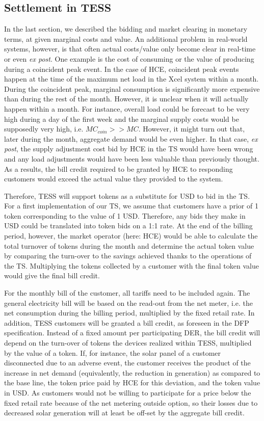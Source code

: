 \documentclass[12pt]{article}{Definitions/mdpi}
\begin{document}
\subsection{Settlement in TESS}\label{sec:hce_settlement}

In the last section, we described the bidding and market clearing in monetary terms, at given marginal costs and value. An additional problem in real-world systems, however, is that often actual costs/value only become clear in real-time or even  \textit{ex post}. One example is the cost of consuming or the value of producing during a coincident peak event. In the case of HCE, coincident  peak events happen at the time of the maximum net load in the Xcel system within a month. During the coincident peak, marginal consumption is significantly more expensive than during the rest of the month. However, it is unclear when it will actually happen within a month. For instance, overall load could be forecast to be very high during a day of the first week and the marginal supply costs would be supposedly very high, i.e. $MC_{coin} >> MC$. However, it might turn out that, later during the month, aggregate demand would be even higher. In that case, \textit{ex post}, the supply adjustment cost bid by HCE in the TS would have been wrong and any load adjustments would have been less valuable than previously thought. As a results, the bill credit required to be granted by HCE to responding customers would exceed the actual value they provided to the system.

Therefore, TESS will support tokens as a substitute for USD to bid in the TS. For a first implementation of our TS, we assume that customers have a prior of 1 token corresponding to the value of 1 USD. Therefore, any bids they make in USD could be translated into token bids on a 1:1 rate. 
At the end of the billing period, however, the market operator (here: HCE) would be able to calculate the total turnover of tokens during the month and determine the actual token value by comparing the turn-over to the savings achieved thanks to the operations of the TS. Multiplying the tokens collected by a customer with the final token value would give the final bill credit.

For the monthly bill of the customer, all tariffs need to be included again. The general electricity bill will be based on the read-out from the net meter, i.e. the net consumption during the billing period, multiplied by the fixed retail rate. In addition, TESS customers will be granted a bill credit, as foreseen in the DFP specification. Instead of a fixed amount per participating DER, the bill credit will depend on the turn-over of tokens the devices realized within TESS, multiplied by the value of a token. If, for instance, the solar panel of a customer disconnected due to an adverse event, the customer receives the product of the increase in net demand (equivalently, the reduction in generation) as compared to the base line, the token price paid by HCE for this deviation, and the token value in USD. As customers would not be willing to participate for a price below the fixed retail rate because of the net metering outside option, so their losses due to decreased solar generation will at least be off-set by the aggregate bill credit.
\end{document}

